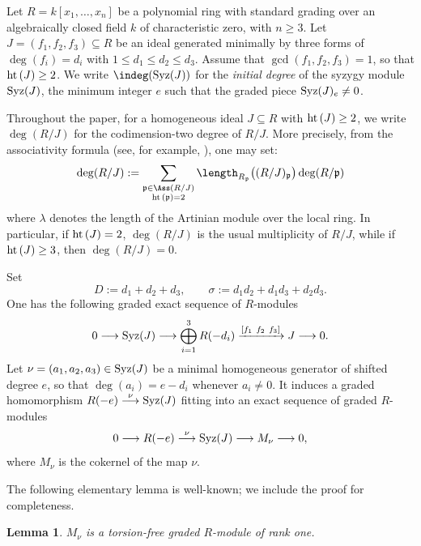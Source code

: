 \documentclass[11pt]{amsart} %
\newcommand{\lar}{\longrightarrow}
\newtheorem{Lemma}[Theorem]{Lemma}
\theoremstyle{definition}
\def\hht{{\rm ht}\,}
\def\syz{\mbox{\rm Syz}}
\def\hht{{\rm ht}\,}
\def\fp{{\mathfrak p}}
\begin{document}
Let $R=k[x_1,\ldots,x_n]$ be a polynomial ring with standard grading over an algebraically closed field $k$ of characteristic zero, with $n \geq 3$. Let $J=(f_1,f_2,f_3)\subseteq R$ be an ideal generated minimally by three forms of $\deg(f_i)=d_i$ with $1\leq d_1\leq d_2\leq d_3$. Assume that $\gcd(f_1,f_2,f_3)=1$, so that $\hht(J)\geq 2$. We write $\indeg(\syz(J))$ for the \emph{initial degree} of the syzygy module $\syz(J)$, the minimum integer $e$ such that the graded piece $\syz(J)_e \neq 0$.

Throughout the paper, for a homogeneous ideal $J\subseteq R$ with $\hht(J)\geq 2$, we write $\deg(R/J)$ for the codimension-two degree of $R/J$. More precisely, from the associativity formula (see, for example, \cite[Corollary 4.6.8]{bruns1998cohen}), one may set:
\[
\deg(R/J):=\sum_{\substack{\fp\in\Ass(R/J)\\ \hht(\fp)=2}}
\length_{R_\fp}\big((R/J)_\fp\big)\deg(R/\fp)
\]
where $\lambda$ denotes the length of the Artinian module over the local ring. In particular, if $\hht(J)=2$, $\deg(R/J)$ is the usual multiplicity of $R/J$, while if $\hht(J)\geq 3$, then $\deg(R/J)=0$.

Set
\[
D:=d_1+d_2+d_3,
\qquad
\sigma:=d_1d_2+d_1d_3+d_2d_3.
\]
One has the following graded exact sequence of $R$-modules
\[ 0\lar \syz(J)\lar \bigoplus_{i=1}^3R(-d_i)\xrightarrow{[f_1\  f_2\ f_3]} J\lar 0.\]
Let $\nu=(a_1,a_2,a_3)\in\syz(J)$ be a minimal homogeneous generator of shifted degree $e$, so that $\deg(a_i)=e-d_i$ whenever $a_i\neq0$. It induces a graded homomorphism $R(-e)\stackrel{\nu}{\lar} \syz(J)$ fitting into an exact sequence of graded $R$-modules
\[ 0\lar R(-e)\stackrel{\nu}{\lar} \syz(J) \lar M_\nu\lar 0, \]
where $M_\nu$ is the cokernel of the map $\nu$. 

The following elementary lemma is well-known; we include the proof for completeness.

\begin{Lemma}\label{lem:cok-torsion-free}
$M_\nu$ is a torsion-free graded $R$-module of rank one.
\end{Lemma}
\end{document}
